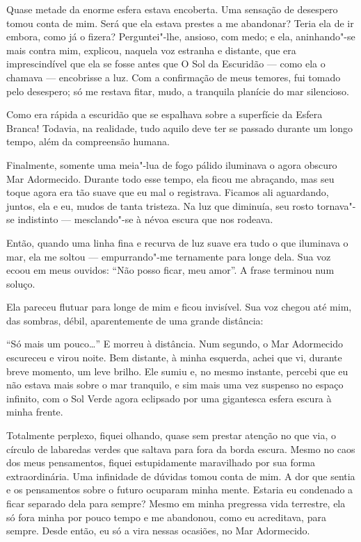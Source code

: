 Quase metade da enorme esfera estava encoberta. Uma sensação de desespero tomou conta de mim. Será que ela estava
prestes a me abandonar? Teria ela de ir embora, como já o fizera? Perguntei"-lhe, ansioso, com medo; e ela,
aninhando"-se mais contra mim, explicou, naquela voz estranha e distante, que era imprescindível que ela se fosse antes
que O Sol da Escuridão --- como ela o chamava --- encobrisse a luz. Com a confirmação de meus temores, fui tomado pelo
desespero; só me restava fitar, mudo, a tranquila planície do mar silencioso.

Como era rápida a escuridão que se espalhava sobre a superfície da Esfera Branca! Todavia, na realidade, tudo
aquilo deve ter se passado durante um longo tempo, além da compreensão humana.

Finalmente, somente uma meia"-lua de fogo pálido iluminava o agora obscuro Mar Adormecido. Durante todo esse tempo, ela
ficou me abraçando, mas seu toque agora era tão suave que eu mal o registrava. Ficamos ali aguardando, juntos, ela e
eu, mudos de tanta tristeza. Na luz que diminuía, seu rosto tornava"-se indistinto --- mesclando"-se à névoa escura que nos
rodeava.

Então, quando uma linha fina e recurva de luz suave era tudo o que iluminava o mar, ela me soltou --- empurrando"-me
ternamente para longe dela. Sua voz ecoou em meus ouvidos: “Não posso ficar, meu amor”. A frase terminou num soluço.

Ela pareceu flutuar para longe de mim e ficou invisível. Sua voz chegou até mim, das sombras, débil, aparentemente de
uma grande distância:

``Só mais um pouco\ldots{}'' E morreu à distância. Num segundo, o Mar Adormecido escureceu e virou noite. Bem distante, à
minha esquerda, achei que vi, durante breve momento, um leve brilho. Ele sumiu e, no mesmo instante, percebi que eu
não estava mais sobre o mar tranquilo, e sim mais uma vez suspenso no espaço infinito, com o Sol Verde agora eclipsado
por uma gigantesca esfera escura à minha frente.

Totalmente perplexo, fiquei olhando, quase sem prestar atenção no que via, o círculo de labaredas verdes que saltava
para fora da borda escura. Mesmo no caos dos meus pensamentos, fiquei estupidamente maravilhado por sua forma
extraordinária. Uma infinidade de dúvidas tomou conta de mim. A dor que sentia e os pensamentos sobre o futuro ocuparam
minha mente. Estaria eu condenado a ficar separado dela para sempre? Mesmo em minha pregressa vida terrestre, ela só
fora minha por pouco tempo e me abandonou, como eu acreditava, para sempre. Desde então, eu só a vira nessas
ocasiões, no Mar Adormecido.

